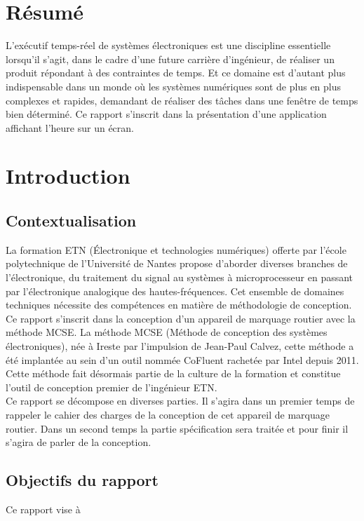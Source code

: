 \documentclass[french]{article}
\begin{document}
	\newpage
	
	\tableofcontents
	\newpage
	\listoffigures
	\listoftables
	\newpage
	
	
	\vspace*{4cm}
	\section*{Résumé}
	L'exécutif temps-réel de systèmes électroniques est une discipline essentielle lorsqu'il s'agit, dans le cadre d'une future carrière d'ingénieur, de réaliser un produit répondant à des contraintes de temps. Et ce domaine est d'autant plus indispensable dans un monde où les systèmes numériques sont de plus en plus complexes et rapides, demandant de réaliser des tâches dans une fenêtre de temps bien déterminé. Ce rapport s'inscrit dans la présentation d'une application affichant l'heure sur un écran.

	
	\newpage
	\pagestyle{plain} %
	
	\section{Introduction}
	\subsection{Contextualisation}
	La formation ETN (Électronique et technologies numériques) offerte par l'école polytechnique de l'Université de Nantes propose d'aborder diverses branches de l'électronique, du traitement du signal au systèmes à microprocesseur en passant par l'électronique analogique des hautes-fréquences. Cet ensemble de domaines techniques nécessite des compétences en matière de méthodologie de conception. Ce rapport s'inscrit dans la conception d'un appareil de marquage routier avec la méthode MCSE. La méthode MCSE (Méthode de conception des systèmes électroniques), née à Ireste par l'impulsion de Jean-Paul Calvez, cette méthode a été implantée au sein d'un outil nommée CoFluent rachetée par Intel\mbox{\textregistered } depuis 2011. Cette méthode fait désormais partie de la culture de la formation et constitue l'outil de conception premier de l'ingénieur ETN.\\
	Ce rapport se décompose en diverses parties. Il s'agira dans un premier temps de rappeler le cahier des charges de la conception de cet appareil de marquage routier. Dans un second temps la partie spécification sera traitée et pour finir il s'agira de parler de la conception.\\
	
	
	\subsection{Objectifs du rapport}
	Ce rapport vise à 
	
	\newpage
	
	

	
\end{document}
